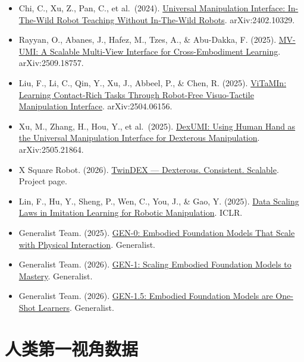 \vspace{0.25em}
\begin{itemize}
\tightlist
\item
  Chi, C., Xu, Z., Pan, C., et al.~(2024). \href{https://arxiv.org/abs/2402.10329}{Universal Manipulation Interface: In-The-Wild Robot Teaching Without In-The-Wild Robots}. arXiv:2402.10329.
\item
  Rayyan, O., Abanes, J., Hafez, M., Tzes, A., \& Abu-Dakka, F. (2025). \href{https://arxiv.org/abs/2509.18757}{MV-UMI: A Scalable Multi-View Interface for Cross-Embodiment Learning}. arXiv:2509.18757.
\item
  Liu, F., Li, C., Qin, Y., Xu, J., Abbeel, P., \& Chen, R. (2025). \href{https://arxiv.org/abs/2504.06156}{ViTaMIn: Learning Contact-Rich Tasks Through Robot-Free Visuo-Tactile Manipulation Interface}. arXiv:2504.06156.
\item
  Xu, M., Zhang, H., Hou, Y., et al.~(2025). \href{https://arxiv.org/abs/2505.21864}{DexUMI: Using Human Hand as the Universal Manipulation Interface for Dexterous Manipulation}. arXiv:2505.21864.
\item
  X Square Robot. (2026). \href{https://x2robot.com/en/pages/twindex}{TwinDEX --- Dexterous. Consistent. Scalable}. Project page.
\item
  Lin, F., Hu, Y., Sheng, P., Wen, C., You, J., \& Gao, Y. (2025). \href{https://proceedings.iclr.cc/paper_files/paper/2025/hash/88b7b2c896506daabc8d3fd587055167-Abstract-Conference.html}{Data Scaling Laws in Imitation Learning for Robotic Manipulation}. ICLR.
\item
  Generalist Team. (2025). \href{https://generalistai.com/blog/gen-0}{GEN-0: Embodied Foundation Models That Scale with Physical Interaction}. Generalist.
\item
  Generalist Team. (2026). \href{https://generalistai.com/blog/gen-1}{GEN-1: Scaling Embodied Foundation Models to Mastery}. Generalist.
\item
  Generalist Team. (2026). \href{https://generalistai.com/blog/gen-1.5}{GEN-1.5: Embodied Foundation Models are One-Shot Learners}. Generalist.
\end{itemize}

\clearpage

\hypertarget{ux4ebaux7c7bux7b2cux4e00ux89c6ux89d2ux6570ux636e}{%
\section{人类第一视角数据}\label{ux4ebaux7c7bux7b2cux4e00ux89c6ux89d2ux6570ux636e}}

